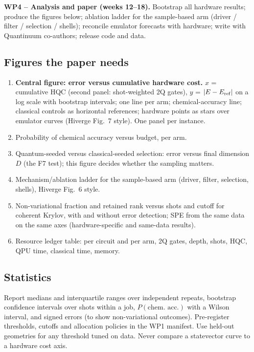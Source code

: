 \documentclass[11pt,a4paper]{article}
\begin{document}
\textbf{WP4 -- Analysis and paper (weeks 12--18).} Bootstrap all hardware results; produce the figures below; ablation ladder for the sample-based arm (driver / filter / selection / shells); reconcile emulator forecasts with hardware; write with Quantinuum co-authors; release code and data.

\subsection{Figures the paper needs}
\begin{enumerate}
\item \textbf{Central figure: error versus cumulative hardware cost.} $x$ = cumulative HQC (second panel: shot-weighted 2Q gates), $y$ = $|E-E_{\rm ref}|$ on a log scale with bootstrap intervals; one line per arm; chemical-accuracy line; classical controls as horizontal references; hardware points as stars over emulator curves (Hiverge Fig.~7 style). One panel per instance.
\item Probability of chemical accuracy versus budget, per arm.
\item Quantum-seeded versus classical-seeded selection: error versus final dimension $D$ (the F7 test); this figure decides whether the sampling matters.
\item Mechanism/ablation ladder for the sample-based arm (driver, filter, selection, shells), Hiverge Fig.~6 style.
\item Non-variational fraction and retained rank versus shots and cutoff for coherent Krylov, with and without error detection; SPE from the same data on the same axes (hardware-specific and same-data results).
\item Resource ledger table: per circuit and per arm, 2Q gates, depth, shots, HQC, QPU time, classical time, memory.
\end{enumerate}

\subsection{Statistics}
Report medians and interquartile ranges over independent repeats, bootstrap confidence intervals over shots within a job, $P(\text{chem.\ acc.})$ with a Wilson interval, and signed errors (to show non-variational outcomes). Pre-register thresholds, cutoffs and allocation policies in the WP1 manifest. Use held-out geometries for any threshold tuned on data. Never compare a statevector curve to a hardware cost axis.
\end{document}
